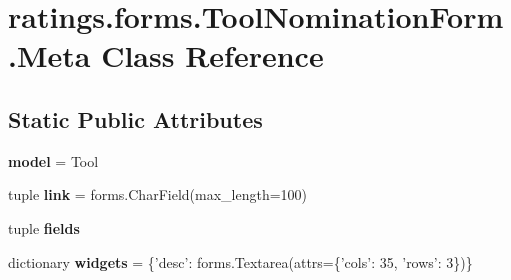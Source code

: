 \hypertarget{classratings_1_1forms_1_1ToolNominationForm_1_1Meta}{\section{ratings.\-forms.\-Tool\-Nomination\-Form.\-Meta Class Reference}
\label{classratings_1_1forms_1_1ToolNominationForm_1_1Meta}
}
\subsection*{Static Public Attributes}
\begin{DoxyCompactItemize}
\item 
\hypertarget{classratings_1_1forms_1_1ToolNominationForm_1_1Meta_a572b63db259c55f4106cee3e4cf6226e}{{\bfseries model} = Tool}\label{classratings_1_1forms_1_1ToolNominationForm_1_1Meta_a572b63db259c55f4106cee3e4cf6226e}

\item 
\hypertarget{classratings_1_1forms_1_1ToolNominationForm_1_1Meta_aca5439f4f5c821d07bf5481b4cedab96}{tuple {\bfseries link} = forms.\-Char\-Field(max\-\_\-length=100)}\label{classratings_1_1forms_1_1ToolNominationForm_1_1Meta_aca5439f4f5c821d07bf5481b4cedab96}

\item 
tuple {\bfseries fields}
\item 
\hypertarget{classratings_1_1forms_1_1ToolNominationForm_1_1Meta_a691d68ae9f3eaf5573aa3d0968756de3}{dictionary {\bfseries widgets} = \{'desc'\-: forms.\-Textarea(attrs=\{'cols'\-: 35, 'rows'\-: 3\})\}}\label{classratings_1_1forms_1_1ToolNominationForm_1_1Meta_a691d68ae9f3eaf5573aa3d0968756de3}

\end{DoxyCompactItemize}


